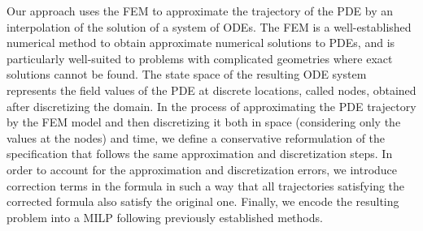 \documentclass[letterpaper, 10 pt, conference]{ieeeconf/ieeeconf}
\begin{document}
%



Our approach uses the FEM to
approximate the trajectory of the PDE by an interpolation of the solution of a
system of ODEs. The FEM is a well-established
numerical method to obtain approximate numerical solutions to PDEs, and is particularly
well-suited to problems with complicated
geometries where exact solutions cannot be found. The state space of the
resulting ODE system represents the field values of the PDE at discrete 
locations, called nodes, obtained after discretizing the domain.
In the process of approximating the PDE trajectory by the FEM model and then
discretizing it both in space (considering only the values at the nodes) and time, 
we define a conservative
reformulation of the specification that follows the same approximation and
discretization steps. In order to account for the approximation and
discretization errors, we introduce correction terms in the formula in such a way
that all trajectories satisfying the corrected formula also satisfy the
original one. Finally, we encode the resulting problem into a MILP 
following previously established methods.
\end{document}
